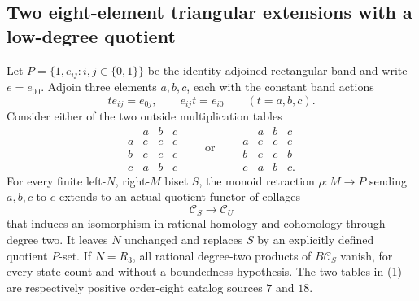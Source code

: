 \subsection{Two eight-element triangular extensions with a low-degree quotient}

\begin{theorem}
\label{CP2:A-eight-triangular-low-degree-quotients}
Let $P=\{1,e_{ij}:i,j\in\{0,1\}\}$ be the
identity-adjoined rectangular band and write $e=e_{00}$.
Adjoin three elements $a,b,c$, each with the constant
band actions
\[
 te_{ij}=e_{0j},\qquad e_{ij}t=e_{i0}
       \qquad(t=a,b,c).
\]
Consider either of the two outside multiplication tables
\[
\begin{array}{c|ccc}
 &a&b&c\\\hline
a&e&e&e\\b&e&e&e\\c&a&b&c
\end{array}
\qquad\text{or}\qquad
\begin{array}{c|ccc}
 &a&b&c\\\hline
a&e&e&e\\b&e&e&b\\c&a&b&c.
\end{array}                                                     \tag{1}
\]
For every finite left-$N$, right-$M$ biset $S$, the
monoid retraction $\rho:M\to P$ sending $a,b,c$ to
$e$ extends to an actual quotient functor of collages
\[
 \mathcal C_S\longrightarrow\mathcal C_U
\]
that induces an isomorphism in rational homology and
cohomology through degree two.  It leaves $N$ unchanged
and replaces $S$ by an explicitly defined quotient $P$-set.
If $N=R_3$, all rational degree-two products of
$B\mathcal C_S$ vanish, for every state count and
without a boundedness hypothesis.
The two tables in (1) are respectively positive
order-eight catalog sources $7$ and $18$.
\end{theorem}
